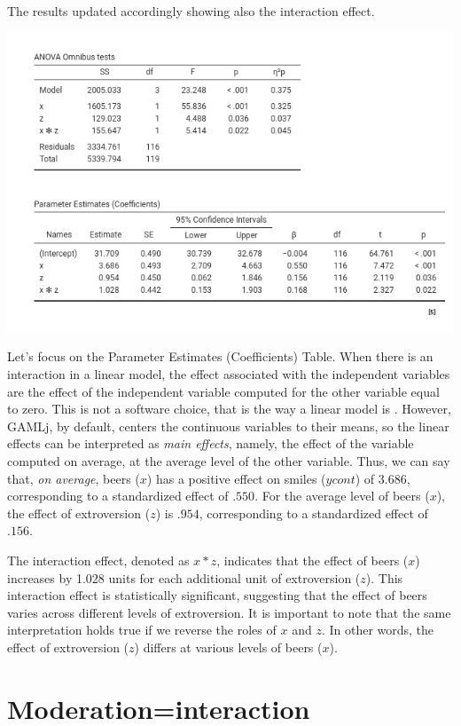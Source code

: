 \documentclass[
]{book}
\begin{document}
The results updated accordingly showing also the interaction effect.

\includegraphics[width=0.9\linewidth]{bookletpics/2_output11}

Let's focus on the {Parameter Estimates (Coefficients)} Table. When there is an interaction in a linear model, the effect associated with the independent variables are the effect of the independent variable computed for the other variable equal to zero. This is not a software choice, that is the way a linear model is \citep{aiken1991multiple}. However, {GAMLj}, by default, centers the continuous variables to their means, so the linear effects can be interpreted as \emph{main effects}, namely, the effect of the variable computed on average, at the average level of the other variable. Thus, we can say that, \emph{on average}, beers (\(x\)) has a positive effect on smiles (\(ycont\)) of \(3.686\), corresponding to a standardized effect of \(.550\). For the average level of beers (\(x\)), the effect of extroversion (\(z\)) is \(.954\), corresponding to a standardized effect of \(.156\).

The interaction effect, denoted as \(x*z\), indicates that the effect of beers (\(x\)) increases by 1.028 units for each additional unit of extroversion (\(z\)). This interaction effect is statistically significant, suggesting that the effect of beers varies across different levels of extroversion. It is important to note that the same interpretation holds true if we reverse the roles of \(x\) and \(z\). In other words, the effect of extroversion (\(z\)) differs at various levels of beers (\(x\)).

\hypertarget{modint}{%
\section{Moderation=interaction}\label{modint}}
\end{document}
